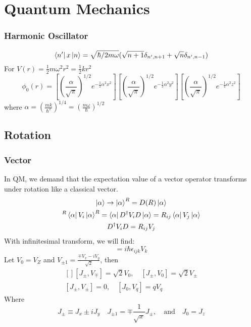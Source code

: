 \chapter{Quantum Mechanics}
\subsection{Harmonic Oscillator}
\[
    \bra{n'}x\ket{n}=\sqrt{\hbar/2m\omega}(\sqrt{n+1}\delta_{n',n+1}+\sqrt{n}\delta_{n',n-1})
    \]
For $V(r)=\frac{1}{2}m\omega^2r^2=\frac{1}{2}kr^2$
\[
    \phi_0(r)=[(\frac{\alpha}{\sqrt{\pi}})^{1/2}e^{-\frac{1}{2}\alpha^2x^2}]
    [(\frac{\alpha}{\sqrt{\pi}})^{1/2}e^{-\frac{1}{2}\alpha^2y^2}]
    [(\frac{\alpha}{\sqrt{\pi}})^{1/2}e^{-\frac{1}{2}\alpha^2z^2}]
    \]
where $\alpha=(\frac{mk}{\hbar^2})^{1/4}=(\frac{m\omega}{\hbar})^{1/2}$

\section{Rotation}

\subsection{Vector}
In QM, we demand that the expectation value of a vector operator transforms
under rotation like a classical vector.
\begin{gather*}
    \ket{\alpha}\rightarrow\ket{\alpha}^R=D(R)\ket{\alpha}\\
    ^{R}\bra{\alpha}V_i\ket{\alpha}^R=\bra{\alpha}D^{\dag}V_{i}D\ket{\alpha}=R_{ij}\bra{\alpha}V_j\ket{\alpha}\\
    D^{\dag}V_{i}D=R_{ij}V_j
\end{gather*}
With infinitesimal transform, we will find:
\begin{equation}
    [J_i,V_j]=i\hbar\epsilon_{ijk}V_k
\end{equation}
Let $V_0 = V_Z$ and $V_{\pm 1} = \frac{\mp V_x -iV_y}{\sqrt{2}}$, 
then
\[
    \begin{aligned}[]
	[J_\pm, V_\mp] = \sqrt{2}V_0 , \quad [J_\pm, V_0] = \sqrt{2}V_\pm \\
	[J_\pm, V_\pm] = 0, \quad [J_0, V_q] = qV_q
    \end{aligned}
\]
Where
\begin{equation}
    J_\pm \equiv J_x \pm iJ_y	\quad J_{\pm 1} = \mp \frac{1}{\sqrt{x}}J_\pm, \quad \text{and} \quad J_0 = J_z
\end{equation}


